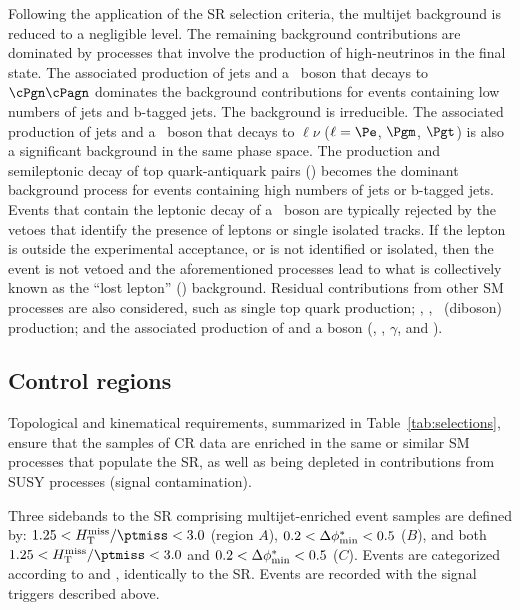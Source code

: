 Following the application of the SR selection criteria, the multijet
background is reduced to a negligible level. The remaining background
contributions are dominated by processes that involve the production
of high-\pt neutrinos in the final state. The associated production of
jets and a \cPZ\ boson that decays to $\cPgn\cPagn$ dominates the
background contributions for events containing low numbers of jets and
b-tagged jets. The \znunuj background is irreducible. The associated
production of jets and a \PW\ boson that decays to $\ell\nu$
($\ell=\Pe$, $\Pgm$, $\Pgt$) is also a significant background in the
same phase space. The production and semileptonic decay of top
quark-antiquark pairs (\ttbar) becomes the dominant background process
for events containing high numbers of jets or b-tagged jets. Events
that contain the leptonic decay of a \PW\ boson are typically rejected
by the vetoes that identify the presence of leptons or single isolated
tracks. If the lepton is outside the experimental acceptance, or is
not identified or isolated, then the event is not vetoed and the
aforementioned processes lead to what is collectively known as the
``lost lepton'' (\lost) background. Residual contributions from other
SM processes are also considered, such as single top quark production;
\PW\PW, \PW\cPZ, \cPZ\cPZ\ (diboson) production; and the associated
production of \ttbar and a boson ({\ttbar\PW}, {\ttbar\cPZ},
{\ttbar}$\gamma$, and {\ttbar\PH}).

\subsection{Control regions}
\label{sec:control}

Topological and kinematical requirements, summarized in
Table~\ref{tab:selections}, ensure that the samples of CR data are
enriched in the same or similar SM processes that populate the SR, as
well as being depleted in contributions from SUSY processes (signal
contamination).

Three sidebands to the SR comprising multijet-enriched event samples
are defined by: $1.25 < \mhtmet < 3.0$ (region $A$), $0.2 < \Delta\phi^{*}_\text{min} <
0.5$ ($B$), and both $1.25 < \mhtmet < 3.0$ and $0.2 < \Delta\phi^{*}_\text{min} < 0.5$
($C$). Events are categorized according to \njet and \scalht,
identically to the SR. Events are recorded with the signal triggers
described above.

